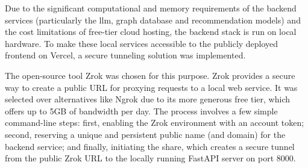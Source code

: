 Due to the significant computational and memory requirements of the backend services (particularly the \ac{llm}, graph database and recommendation models) and the cost limitations of free-tier cloud hosting, the backend stack is run on local hardware. To make these local services accessible to the publicly deployed frontend on Vercel, a secure tunneling solution was implemented.

The open-source tool Zrok \cite{ZROK} was chosen for this purpose. Zrok provides a secure way to create a public URL for proxying requests to a local web service. It was selected over alternatives like Ngrok due to its more generous free tier, which offers up to 5GB of bandwidth per day. The process involves a few simple command-line steps: first, enabling the Zrok environment with an account token; second, reserving a unique and persistent public name (and domain) for the backend service; and finally, initiating the share, which creates a secure tunnel from the public Zrok URL to the locally running FastAPI server on port 8000.